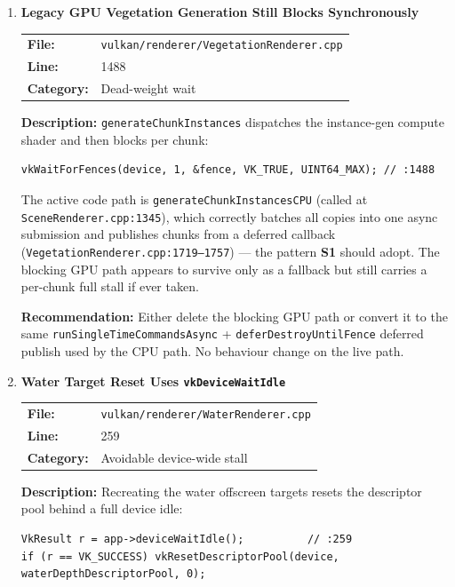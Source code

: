 \documentclass[a4paper,12pt]{article}
\newcommand{\severitybox}[2]{%
  \colorbox{#1}{\makebox[2.5cm][c]{\textcolor{white}{\textbf{#2}}}}%
}
\begin{document}
\begin{enumerate}[leftmargin=*]
\item[\textbf{[S6]}] \textbf{Legacy GPU Vegetation Generation Still Blocks Synchronously}
  \hfill \severitybox{lowcolor}{LOW}

  \begin{tabular}{ll}
    \textbf{File:} & \texttt{vulkan/renderer/VegetationRenderer.cpp} \\
    \textbf{Line:} & 1488 \\
    \textbf{Category:} & Dead-weight wait \\
  \end{tabular}

  \textbf{Description:}
  \texttt{generateChunkInstances} dispatches the instance-gen compute shader and
  then blocks per chunk:

\begin{lstlisting}
vkWaitForFences(device, 1, &fence, VK_TRUE, UINT64_MAX); // :1488
\end{lstlisting}

  The active code path is \texttt{generateChunkInstancesCPU}
  (called at \texttt{SceneRenderer.cpp:1345}), which correctly batches all copies
  into one async submission and publishes chunks from a deferred callback
  (\texttt{VegetationRenderer.cpp:1719--1757}) — the pattern \textbf{S1} should
  adopt. The blocking GPU path appears to survive only as a fallback but still
  carries a per-chunk full stall if ever taken.

  \textbf{Recommendation:}
  Either delete the blocking GPU path or convert it to the same
  \texttt{runSingleTimeCommandsAsync} + \texttt{deferDestroyUntilFence} deferred
  publish used by the CPU path. No behaviour change on the live path.

\item[\textbf{[S7]}] \textbf{Water Target Reset Uses \texttt{vkDeviceWaitIdle}}
  \hfill \severitybox{lowcolor}{LOW}

  \begin{tabular}{ll}
    \textbf{File:} & \texttt{vulkan/renderer/WaterRenderer.cpp} \\
    \textbf{Line:} & 259 \\
    \textbf{Category:} & Avoidable device-wide stall \\
  \end{tabular}

  \textbf{Description:}
  Recreating the water offscreen targets resets the descriptor pool behind a
  full device idle:

\begin{lstlisting}
VkResult r = app->deviceWaitIdle();          // :259
if (r == VK_SUCCESS) vkResetDescriptorPool(device, waterDepthDescriptorPool, 0);
\end{lstlisting}


\end{enumerate}
\end{document}
